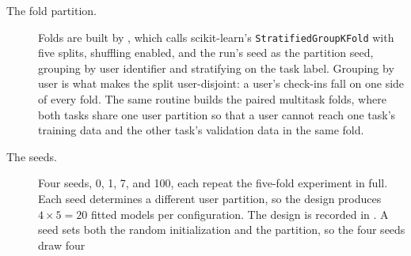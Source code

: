 \begin{description}
  \item[The fold partition.] Folds are built by
        , which calls scikit-learn's
        \texttt{StratifiedGroupKFold} with five splits, shuffling enabled, and the run's
        seed as the partition seed, grouping by user identifier and stratifying on the task
        label. Grouping by user is what makes the split user-disjoint: a user's
        check-ins fall on one side of every fold.
        The same routine builds the paired multitask folds, where both tasks share one
        user partition so that a user
        cannot reach one task's training data and the other task's validation data in
        the same fold.
  \item[The seeds.] Four seeds, 0, 1, 7, and 100, each repeat the
        five-fold experiment in full. Each seed determines a different user
        partition, so the design produces $4\times5=20$ fitted models per
        configuration. The design is recorded in
        . A seed
        sets both the random initialization and the partition, so the four seeds draw four

\end{description}
